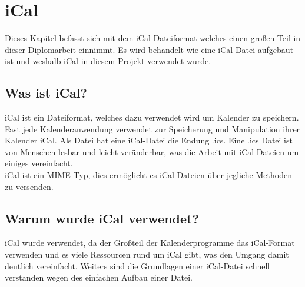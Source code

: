 
\renewcommand{\theauthor}{Matthias Franz}
\section{iCal}
\label{sec:iCal}
Dieses Kapitel befasst sich mit dem iCal-Dateiformat welches einen großen Teil in dieser Diplomarbeit einnimmt. Es wird behandelt wie eine iCal-Datei aufgebaut ist und weshalb iCal in diesem Projekt verwendet wurde.

\subsection{Was ist iCal?}
\label{sec:wasIstiCal?}
iCal ist ein Dateiformat, welches dazu verwendet wird um Kalender zu speichern. Fast jede Kalenderanwendung verwendet zur Speicherung und Manipulation ihrer Kalender iCal. Als Datei hat eine iCal-Datei die Endung .ics. Eine .ics Datei ist von Menschen lesbar und leicht veränderbar, was die Arbeit mit iCal-Dateien um einiges vereinfacht. \\
iCal ist ein MIME-Typ, dies ermöglicht es iCal-Dateien über jegliche Methoden zu versenden.\\ \textcite{iCalDocumentation} 

\subsection{Warum wurde iCal verwendet?}
\label{sec:warumWurdeiCalVerwendet?}
iCal wurde verwendet, da der Großteil der Kalenderprogramme das iCal-Format verwenden und es viele Ressourcen rund um iCal gibt, was den Umgang damit deutlich vereinfacht. Weiters sind die Grundlagen einer iCal-Datei schnell verstanden wegen des einfachen Aufbau einer Datei.

